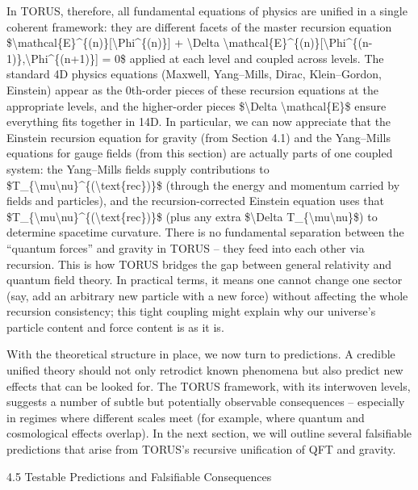 \documentclass[
]{article}
\begin{document}
In TORUS, therefore, all fundamental equations of physics are unified in
a single coherent framework: they are different facets of the master
recursion equation
\$\textbackslash mathcal\{E\}\^{}\{(n)\}{[}\textbackslash Phi\^{}\{(n)\}{]}
+ \textbackslash Delta
\textbackslash mathcal\{E\}\^{}\{(n)\}{[}\textbackslash Phi\^{}\{(n-1)\},\textbackslash Phi\^{}\{(n+1)\}{]}
= 0\$ applied at each level and coupled across levels. The standard 4D
physics equations (Maxwell, Yang--Mills, Dirac, Klein--Gordon, Einstein)
appear as the 0th-order pieces of these recursion equations at the
appropriate levels, and the higher-order pieces \$\textbackslash Delta
\textbackslash mathcal\{E\}\$ ensure everything fits together in 14D. In
particular, we can now appreciate that the Einstein recursion equation
for gravity (from Section 4.1) and the Yang--Mills equations for gauge
fields (from this section) are actually parts of one coupled system: the
Yang--Mills fields supply contributions to
\$T\_\{\textbackslash mu\textbackslash nu\}\^{}\{(\textbackslash text\{rec\})\}\$
(through the energy and momentum carried by fields and particles), and
the recursion-corrected Einstein equation uses that
\$T\_\{\textbackslash mu\textbackslash nu\}\^{}\{(\textbackslash text\{rec\})\}\$
(plus any extra \$\textbackslash Delta
T\_\{\textbackslash mu\textbackslash nu\}\$) to determine spacetime
curvature. There is no fundamental separation between the ``quantum
forces'' and gravity in TORUS -- they feed into each other via
recursion. This is how TORUS bridges the gap between general relativity
and quantum field theory. In practical terms, it means one cannot change
one sector (say, add an arbitrary new particle with a new force) without
affecting the whole recursion consistency; this tight coupling might
explain why our universe's particle content and force content is as it
is.

With the theoretical structure in place, we now turn to predictions. A
credible unified theory should not only retrodict known phenomena but
also predict new effects that can be looked for. The TORUS framework,
with its interwoven levels, suggests a number of subtle but potentially
observable consequences -- especially in regimes where different scales
meet (for example, where quantum and cosmological effects overlap). In
the next section, we will outline several falsifiable predictions that
arise from TORUS's recursive unification of QFT and gravity.

4.5 Testable Predictions and Falsifiable Consequences
\end{document}
